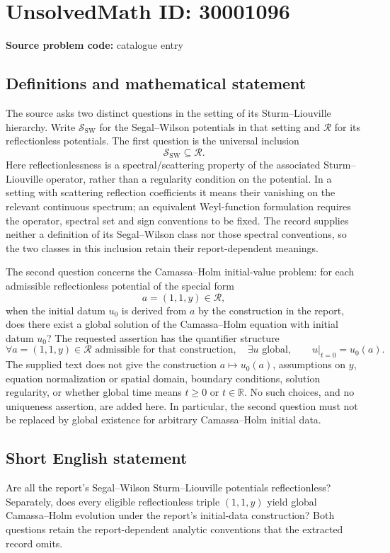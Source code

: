 \documentclass[11pt]{article}
\newcommand{\R}{\mathbb{R}}
\begin{document}
\section*{UnsolvedMath ID: 30001096}
\textbf{Source problem code:} catalogue entry
\subsection{Definitions and mathematical statement}
The source asks two distinct questions in the setting of its Sturm--Liouville hierarchy. Write $\mathcal S_{\mathrm{SW}}$ for the Segal--Wilson potentials in that setting and $\mathcal R$ for its reflectionless potentials. The first question is the universal inclusion
\[
 \mathcal S_{\mathrm{SW}}\subseteq\mathcal R.
\]
Here reflectionlessness is a spectral/scattering property of the associated Sturm--Liouville operator, rather than a regularity condition on the potential. In a setting with scattering reflection coefficients it means their vanishing on the relevant continuous spectrum; an equivalent Weyl-function formulation requires the operator, spectral set and sign conventions to be fixed. The record supplies neither a definition of its Segal--Wilson class nor those spectral conventions, so the two classes in this inclusion retain their report-dependent meanings.

The second question concerns the Camassa--Holm initial-value problem: for each admissible reflectionless potential of the special form
\[
 a=(1,1,y)\in\mathcal R,
\]
when the initial datum $u_0$ is derived from $a$ by the construction in the report, does there exist a global solution of the Camassa--Holm equation with initial datum $u_0$? The requested assertion has the quantifier structure
\[
 \forall a=(1,1,y)\in\mathcal R\text{ admissible for that construction},\quad
 \exists u\text{ global},\qquad u|_{t=0}=u_0(a).
\]
The supplied text does not give the construction $a\mapsto u_0(a)$, assumptions on $y$, equation normalization or spatial domain, boundary conditions, solution regularity, or whether global time means $t\geq0$ or $t\in\R$. No such choices, and no uniqueness assertion, are added here. In particular, the second question must not be replaced by global existence for arbitrary Camassa--Holm initial data.
\subsection{Short English statement}
Are all the report's Segal--Wilson Sturm--Liouville potentials reflectionless? Separately, does every eligible reflectionless triple $(1,1,y)$ yield global Camassa--Holm evolution under the report's initial-data construction? Both questions retain the report-dependent analytic conventions that the extracted record omits.
\end{document}
